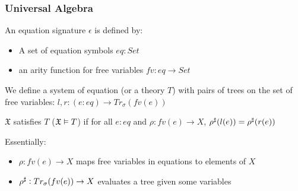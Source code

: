\documentclass[9pt]{beamer}
\begin{document}
\begin{frame}
\frametitle{Universal Algebra}

An equation signature $\epsilon$ is defined by:
\begin{itemize}
    \item A set of equation symbols $eq : Set$
    \item an arity function for free variables $fv : eq \to Set$
\end{itemize}

We define a system of equation (or a theory $T$) with pairs of trees on the set of free variables:
$l, r : (e : eq) \to Tr_\sigma(fv(e))$

$\mathfrak{X}$ satisfies $T$ ($\mathfrak{X} \vDash T$) if for all $e : eq$ and $\rho : fv(e) \to X$,
${\rho}^{\sharp}(l(e)) = {\rho}^{\sharp}(r(e))$

Essentially:
\begin{itemize}
    \item $\rho : fv(e) \to X$ maps free variables in equations to elements of $X$
    \item ${\rho}^{\sharp} : Tr_\sigma(fv(e)) \to X$ evaluates a tree given some variables
\end{itemize}

\end{frame}
\end{document}
